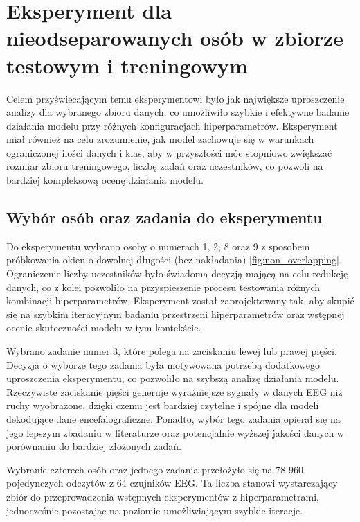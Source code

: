 \documentclass[eeg_v4.tex]{subfiles}
\begin{document}
    \section{Eksperyment dla nieodseparowanych osób w zbiorze testowym i treningowym}
    \label{sec:exp_non_separated}
    Celem przyświecającym temu eksperymentowi było jak największe uproszczenie analizy dla wybranego zbioru danych, co
    umożliwiło szybkie i efektywne badanie działania modelu przy różnych konfiguracjach hiperparametrów. Eksperyment
    miał również na celu zrozumienie, jak model zachowuje się w warunkach ograniczonej ilości danych i klas, aby w
    przyszłości móc stopniowo zwiększać rozmiar zbioru treningowego, liczbę zadań oraz uczestników, co pozwoli na
    bardziej kompleksową ocenę działania modelu.

    \subsection{Wybór osób oraz zadania do eksperymentu}

    Do eksperymentu wybrano osoby o numerach 1, 2, 8 oraz 9 z sposobem próbkowania okien o dowolnej długości (bez
    nakładania) \ref{fig:non_overlapping}. Ograniczenie liczby uczestników było świadomą decyzją
    mającą na celu redukcję danych, co z kolei pozwoliło na przyspieszenie procesu testowania różnych kombinacji
    hiperparametrów. Eksperyment został zaprojektowany tak, aby skupić się na szybkim iteracyjnym badaniu przestrzeni
    hiperparametrów oraz wstępnej ocenie skuteczności modelu w tym kontekście.

    Wybrano zadanie numer 3, które polega na zaciskaniu lewej lub prawej pięści. Decyzja o wyborze tego zadania była
    motywowana potrzebą dodatkowego uproszczenia eksperymentu, co pozwoliło na szybszą analizę działania modelu.
    Rzeczywiste zaciskanie pięści generuje wyraźniejsze sygnały w danych EEG niż ruchy wyobrażone, dzięki czemu jest
    bardziej czytelne i spójne dla modeli dekodujące dane encefalograficzne. Ponadto, wybór tego zadania opierał się
    na jego lepszym zbadaniu w literaturze oraz potencjalnie wyższej jakości danych w porównaniu do bardziej złożonych
    zadań.

    Wybranie czterech osób oraz jednego zadania przełożyło się na 78 960 pojedynczych odczytów z 64 czujników EEG. Ta
    liczba stanowi wystarczający zbiór do przeprowadzenia wstępnych eksperymentów z hiperparametrami, jednocześnie
    pozostając na poziomie umożliwiającym szybkie iteracje.
\end{document}
